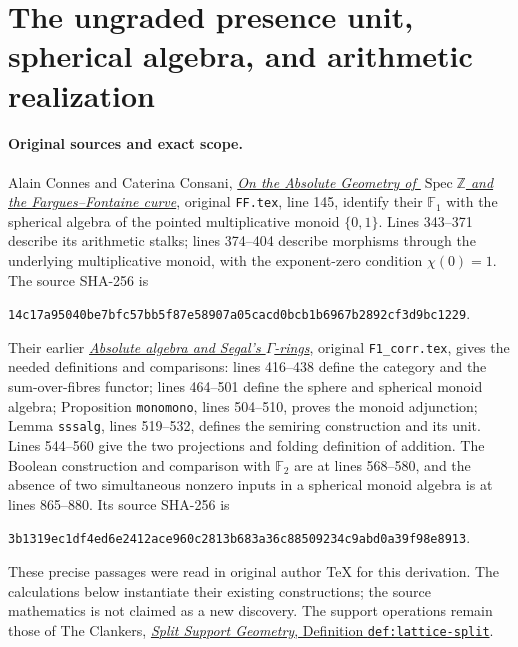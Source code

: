 \section{The ungraded presence unit, spherical algebra, and arithmetic realization}
\label{sec:f1-spherical-parity-base-change}

\paragraph{Original sources and exact scope.}
Alain Connes and Caterina Consani,
\href{https://arxiv.org/abs/2606.06604v1}{\emph{On the Absolute
Geometry of $\operatorname{Spec}\mathbb Z$ and the Fargues--Fontaine
curve}}, original \nolinkurl{FF.tex}, line 145, identify their
$\mathbb F_1$ with the spherical algebra of the pointed
multiplicative monoid $\{0,1\}$. Lines 343--371 describe its
arithmetic stalks; lines 374--404 describe morphisms through
the underlying multiplicative monoid, with the exponent-zero
condition $\chi(0)=1$. The source SHA-256 is
\begin{center}\small
\nolinkurl{14c17a95040be7bfc57bb5f87e58907a05cacd0bcb1b6967b2892cf3d9bc1229}.
\end{center}
Their earlier
\href{https://arxiv.org/abs/1502.05585v2}{\emph{Absolute algebra
and Segal's $\Gamma$-rings}}, original \nolinkurl{F1_corr.tex},
gives the needed definitions and comparisons: lines 416--438
define the category and the sum-over-fibres functor; lines
464--501 define the sphere and spherical monoid algebra;
Proposition \texttt{monomono}, lines 504--510, proves the
monoid adjunction; Lemma \texttt{sssalg}, lines 519--532,
defines the semiring construction and its unit. Lines 544--560
give the two projections and folding definition of addition.
The Boolean construction and comparison with $\mathbb F_2$
are at lines 568--580, and the absence of two simultaneous
nonzero inputs in a spherical monoid algebra is at lines
865--880. Its source SHA-256 is
\begin{center}\small
\nolinkurl{3b1319ec1df4ed6e2412ace960c2813b683a36c88509234c9abd0a39f98e8913}.
\end{center}
These precise passages were read in original author TeX for
this derivation. The calculations below instantiate their
existing constructions; the source mathematics is not claimed
as a new discovery. The support operations remain those of
The Clankers,
\href{https://github.com/KokunoYumeto/zeta-function-research-reader/blob/a2851f9eb352e7e4376bc629de86fa4ed9c1c434/workbenches/splitzero-tandem/foundations/split-support-geometry-v11/split_support_geometry_arithmetic_curve_v11.tex#L1226}
{\emph{Split Support Geometry}, Definition \texttt{def:lattice-split}}.

